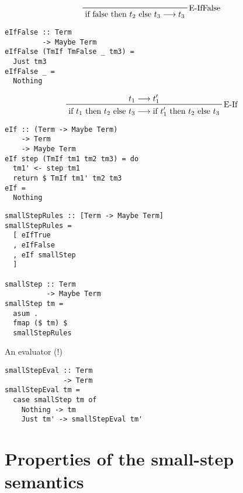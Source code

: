 \documentclass[aspectration=169]{beamer}
\begin{document}
\begin{frame}[fragile]
  \begin{displaymath}
    \prftree[r]{E-IfFalse}
    {\text{if false then $t_2$ else $t_3$} \longrightarrow t_3}
  \end{displaymath}
  \begin{verbatim}
eIfFalse :: Term 
         -> Maybe Term
eIfFalse (TmIf TmFalse _ tm3) =
  Just tm3
eIfFalse _ =
  Nothing
  \end{verbatim}
\end{frame}

\begin{frame}[fragile]
  \begin{displaymath}
    \prftree[r]{E-If}
    {t_1 \longrightarrow t_1^{\prime}}
    {\text{if $t_1$ then $t_2$ else $t_3$} \longrightarrow \text{if $t_1^{\prime}$ then $t_2$ else $t_3$}}
  \end{displaymath}
  \begin{verbatim}
eIf :: (Term -> Maybe Term) 
    -> Term 
    -> Maybe Term
eIf step (TmIf tm1 tm2 tm3) = do
  tm1' <- step tm1
  return $ TmIf tm1' tm2 tm3
eIf =
  Nothing
  \end{verbatim}
\end{frame}

\begin{frame}[fragile]
 \begin{verbatim}
smallStepRules :: [Term -> Maybe Term]
smallStepRules =
  [ eIfTrue
  , eIfFalse
  , eIf smallStep
  ]

smallStep :: Term 
          -> Maybe Term
smallStep tm =
  asum .
  fmap ($ tm) $
  smallStepRules
 \end{verbatim}
\end{frame}

\begin{frame}[fragile]
  \begin{center}
An evaluator (!)
  \end{center}
 \begin{verbatim}
smallStepEval :: Term 
              -> Term
smallStepEval tm =
  case smallStep tm of
    Nothing -> tm
    Just tm' -> smallStepEval tm'
 \end{verbatim}
\end{frame}

\section{Properties of the small-step semantics}
\end{document}
